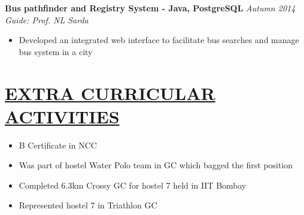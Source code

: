 \documentclass[11pt]{res}
\begin{document}
\begin{resume}
\vspace{-10pt}
\textbf{Bus pathfinder and Registry System - Java, PostgreSQL} \hfill \emph{Autumn 2014}\\
\textsl{Guide: Prof. NL Sarda}\hfill  
\begin{itemize} \itemsep -2pt
\item Developed an integrated web interface to facilitate bus searches and manage bus system in a city
\end{itemize}

\vspace{-10pt}
\section{\underline{EXTRA CURRICULAR ACTIVITIES}}
\vspace{3pt}
\begin{itemize} \itemsep -2pt
\item B Certificate in NCC
\item Was part of hostel Water Polo team in GC which bagged the first position
\item Completed 6.3km Crossy GC for hostel 7 held in IIT Bombay
\item Represented hostel 7 in Triathlon GC
\end{itemize} 

\end{resume} 
\end{document}
